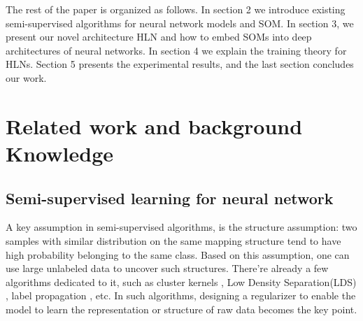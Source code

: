 \documentclass[3p,times,procedia]{elsarticle}
\begin{document}
The rest of the paper is organized
as follows.
In section 2 we introduce existing
semi-supervised algorithms for neural
network models and SOM.
In section 3, we present our novel
architecture HLN and how to
embed SOMs into deep architectures of
neural networks.
In section 4 we explain the 
training theory for HLNs.
Section 5 presents the experimental
results, and the
last section concludes our work.

\section{Related work and background
Knowledge}

\subsection{Semi-supervised learning for
neural network}
A key assumption in semi-supervised 
algorithms, is the 
structure assumption: two samples with 
similar distribution on the same mapping 
structure tend to have high probability 
belonging to the same class. Based on 
this assumption, one can use large 
unlabeled data to uncover such 
structures. There're already a few 
algorithms dedicated to it,
such as cluster kernels
\cite{chapelle2003cluster},
Low Density Separation(LDS)
\cite{chapelle2005semi},
label propagation
\cite{zhu2002learning},
etc.
In such algorithms, designing 
a regularizer
to enable the model to learn 
the representation
or structure of raw data
becomes the key point.
\end{document}
